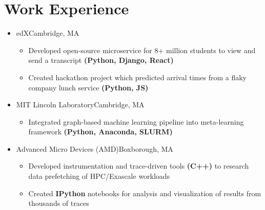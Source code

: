 \documentclass[11pt,letterpaper,sans]{moderncv}
\begin{document}
\section{Work Experience}

\vspace{-1pt}

\begin{itemize}

\item[] {
{edX}{Cambridge, MA}{}{\vspace{1pt}}
\vspace{-9pt}	\begin{itemize}
	 \item Developed open-source microservice for 8+ million students to view and send a transcript \textbf{(Python, Django, React)}
	 \item Created hackathon project which predicted arrival times from a flaky company lunch service \textbf{(Python, JS)}
	\end{itemize}
}
\vspace{4pt}

\item[] {
{MIT Lincoln Laboratory}{Cambridge, MA}{}{\vspace{1pt}}
\vspace{-9pt}	\begin{itemize}
	 \item Integrated graph-based machine learning pipeline into meta-learning framework \textbf{(Python, Anaconda, SLURM)}
	\end{itemize}
}
\vspace{4pt}

\item[] {
{Advanced Micro Devices (AMD)}{Boxborough, MA}{}{\vspace{1pt}}
\vspace{-9pt}	\begin{itemize}
	 \item Developed instrumentation and trace-driven tools \textbf{(C++)} to research data prefetching of HPC/Exascale workloads
	 \item Created \textbf{IPython} notebooks for analysis and visualization of results from thousands of traces
	\end{itemize}
}
\vspace{4pt}


\end{itemize}
\end{document}
